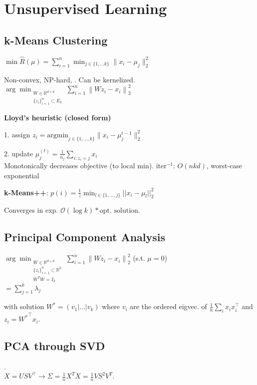 \section*{Unsupervised Learning}

\subsection*{k-Means Clustering}

$\min \hat{R}(\mu) = \sum_{i=1}^n \min_{j\in\{1,...k\}}\|x_i-\mu_j\|_2^2$

Non-convex, NP-hard, . Can be kernelized. \\[-10pt]

$\arg \min_{\substack{W \in \mathbb{R}^{d \times k} \\ \{ z_i \}_{i=1}^{n} \subset E_k}} \sum_{i=1}^{n} \left\| W z_i - x_i \right\|_2^2$




\textbf{Lloyd's heuristic \quad \normalfont \color{black}(closed form)} 

1. assign $z_i = \text{argmin}_{j\in\{1,...,k\}}\|x_i - \mu_j^{t-1}\|_2^2$

2. update $\mu_j^{(t)} = \frac{1}{n_j}\sum_{i:z_i=j}x_i$\\
Monotonically decreases objective (to local min). iter$^{-1}$: $O(nkd)$, worst-case exponential

\textbf{k-Means++}: $p(i) = \frac{1}{z} \min_{l \in \{1,...,j\}} ||x_i - \mu_l||_2^2$

Converges in exp. $\mathcal O (\log k) * \text{opt. solution}$.

\subsection*{Principal Component Analysis}
 
$\arg \min_{\substack{W \in \mathbb{R}^{d \times k} \\ \{ z_i \}_{i=1}^{n} \subset \mathbb{R}^k \\ W^T W = I_k}} \sum_{i=1}^{n} \left\| W z_i - x_i \right\|_2^2
$ (s.t. $\mu = 0$) \\[-17pt]

\hspace{120pt} $= \sum_{j=1}^{k}\lambda_j$

with solution $W^* = (v_1|...|v_k)$ where $v_i$ are the ordered 
eigvec. of $\frac{1}{n}\sum_ix_ix_i^\top$ 
and $z_i = {W^*}^\top x_i$. 

\subsection*{PCA through SVD}
\color{White} . \color {Black}\\[-10pt]
$X = U S V^\top \rightarrow \Sigma = \frac{1}{n} X^T X = \frac{1}{n} VS^2 V^T.$

